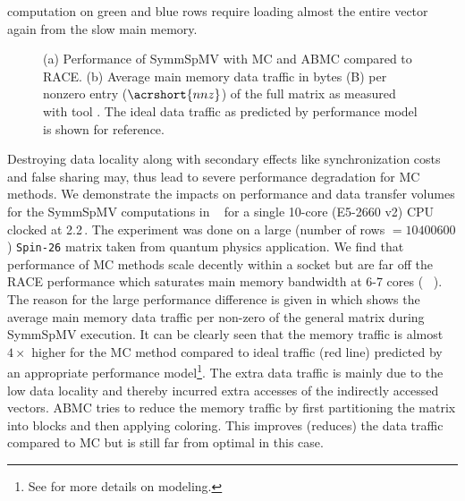 computation on green and blue rows require loading almost the entire vector again 
from the slow main memory.
\begin{figure}[b]
	\hspace{0.5em}
	\caption{\label{fig:motivation}(a) Performance of \acrshort{SymmSpMV} with 
		\acrshort{MC} and \acrshort{ABMC} compared to \acrshort{RACE}. 
		(b) Average main memory data traffic in bytes (B) per nonzero entry ($\acrshort{nnz}$) 
		of the full matrix as measured with \LIKWID tool \cite{LIKWID}. The ideal data traffic
		as predicted by performance model is shown for reference.}
\end{figure}


Destroying data locality along with secondary effects like 
synchronization costs and false sharing may, thus lead to severe performance degradation for MC methods.
We demonstrate the impacts on performance and 
data transfer volumes for the \acrshort{SymmSpMV} computations in ~ for a single 10-core  \Intel \IVB (E5-2660 v2) CPU clocked at 2.2\,\GHZ.
The experiment was done on a large (number of rows $= 10400600$) \texttt{Spin-26} \cite{Spin} matrix taken from quantum physics application. 
We find that performance of MC methods scale decently within a socket but are far off the RACE performance which saturates main memory bandwidth at 6-7 cores (~ ).
The reason for the large performance difference is given in  which shows the average main memory data traffic per non-zero  of the 
general matrix during \acrshort{SymmSpMV} execution. It can be clearly seen that 
the memory traffic is almost  $4 \times$ higher 
for the \acrshort{MC} method compared to ideal traffic (red line) predicted
by an appropriate performance model\footnote{See  for more details on modeling.}.
The extra data traffic is mainly due to the low data locality and thereby incurred 
extra accesses of the indirectly accessed vectors. 
\Acrfull{ABMC} tries to reduce the memory traffic by first partitioning the matrix
into blocks and then applying coloring. This improves (reduces) the data traffic compared 
to \acrshort{MC} but is still far from optimal in this case. 

